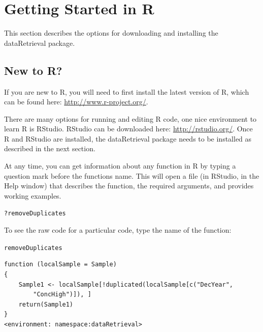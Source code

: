 \documentclass[a4paper,11pt]{article}\usepackage[]{graphicx}\usepackage[]{color}
\makeatletter
\newcommand{\hlopt}[1]{\textcolor[rgb]{0,0,0}{#1}}%
\newcommand{\hlstd}[1]{\textcolor[rgb]{0.345,0.345,0.345}{#1}}%
\newenvironment{kframe}{%
 \def\at@end@of@kframe{}%
 \ifinner\ifhmode%
  \def\at@end@of@kframe{\end{minipage}}%
  \begin{minipage}{\columnwidth}%
 \fi\fi%
 \def\FrameCommand##1{\hskip\@totalleftmargin \hskip-\fboxsep
 \colorbox{shadecolor}{##1}\hskip-\fboxsep
     \hskip-\linewidth \hskip-\@totalleftmargin \hskip\columnwidth}%
 \MakeFramed {\advance\hsize-\width
   \@totalleftmargin\z@ \linewidth\hsize
   \@setminipage}}%
 {\par\unskip\endMakeFramed%
 \at@end@of@kframe}
\newenvironment{knitrout}{}{} %
\makeatother
\begin{document}
\clearpage


\section{Getting Started in R}
\label{sec:appendix1}
This section describes the options for downloading and installing the dataRetrieval package.

\subsection{New to R?}
If you are new to R, you will need to first install the latest version of R, which can be found here: \url{http://www.r-project.org/}.

There are many options for running and editing R code, one nice environment to learn R is RStudio. RStudio can be downloaded here: \url{http://rstudio.org/}. Once R and RStudio are installed, the dataRetrieval package needs to be installed as described in the next section.

At any time, you can get information about any function in R by typing a question mark before the functions name.  This will open a file (in RStudio, in the Help window) that describes the function, the required arguments, and provides working examples.

\begin{knitrout}
\color{fgcolor}\begin{kframe}
\begin{alltt}
\hlopt{?}\hlstd{removeDuplicates}
\end{alltt}
\end{kframe}
\end{knitrout}


To see the raw code for a particular code, type the name of the function:
\begin{knitrout}
\color{fgcolor}\begin{kframe}
\begin{alltt}
\hlstd{removeDuplicates}
\end{alltt}
\begin{verbatim}
function (localSample = Sample) 
{
    Sample1 <- localSample[!duplicated(localSample[c("DecYear", 
        "ConcHigh")]), ]
    return(Sample1)
}
<environment: namespace:dataRetrieval>
\end{verbatim}
\end{kframe}
\end{knitrout}
\end{document}
